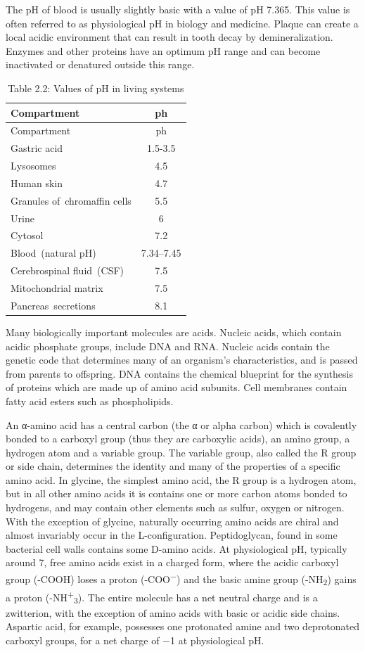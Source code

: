 \documentclass[
]{article}
\theoremstyle{definition}
\theoremstyle{definition}
\theoremstyle{definition}
\theoremstyle{remark}
\begin{document}
The pH of blood is usually slightly basic with a value of pH 7.365. This
value is often referred to as physiological pH in biology and medicine.
Plaque can create a local acidic environment that can result in tooth
decay by demineralization. Enzymes and other proteins have an optimum pH
range and can become inactivated or denatured outside this range.

\begin{longtable}[]{@{}lc@{}}
\caption{ \protect\hypertarget{tab:pH}{}{Table 2.2: }Values of pH in
living systems }\tabularnewline
\toprule
Compartment & ph\tabularnewline
\midrule
\endfirsthead
\toprule
Compartment & ph\tabularnewline
\midrule
\endhead
Gastric acid & 1.5-3.5\tabularnewline
Lysosomes & 4.5\tabularnewline
Human skin & 4.7\tabularnewline
Granules of~chromaffin cells & 5.5\tabularnewline
Urine & 6\tabularnewline
Cytosol & 7.2\tabularnewline
Blood~(natural pH) & 7.34--7.45\tabularnewline
Cerebrospinal fluid~(CSF) & 7.5\tabularnewline
Mitochondrial matrix & 7.5\tabularnewline
Pancreas~secretions & 8.1\tabularnewline
\bottomrule
\end{longtable}

Many biologically important molecules are acids. Nucleic acids, which
contain acidic phosphate groups, include DNA and RNA. Nucleic acids
contain the genetic code that determines many of an organism's
characteristics, and is passed from parents to offspring. DNA contains
the chemical blueprint for the synthesis of proteins which are made up
of amino acid subunits. Cell membranes contain fatty acid esters such as
phospholipids.

An α-amino acid has a central carbon (the α or alpha carbon) which is
covalently bonded to a carboxyl group (thus they are carboxylic acids),
an amino group, a hydrogen atom and a variable group. The variable
group, also called the R group or side chain, determines the identity
and many of the properties of a specific amino acid. In glycine, the
simplest amino acid, the R group is a hydrogen atom, but in all other
amino acids it is contains one or more carbon atoms bonded to hydrogens,
and may contain other elements such as sulfur, oxygen or nitrogen. With
the exception of glycine, naturally occurring amino acids are chiral and
almost invariably occur in the L-configuration. Peptidoglycan, found in
some bacterial cell walls contains some D-amino acids. At physiological
pH, typically around 7, free amino acids exist in a charged form, where
the acidic carboxyl group (-COOH) loses a proton
(-COO\textsuperscript{−}) and the basic amine group
(-NH\textsubscript{2}) gains a proton
(-NH\textsuperscript{+}\textsubscript{3}). The entire molecule has a net
neutral charge and is a zwitterion, with the exception of amino acids
with basic or acidic side chains. Aspartic acid, for example, possesses
one protonated amine and two deprotonated carboxyl groups, for a net
charge of −1 at physiological pH.
\end{document}
